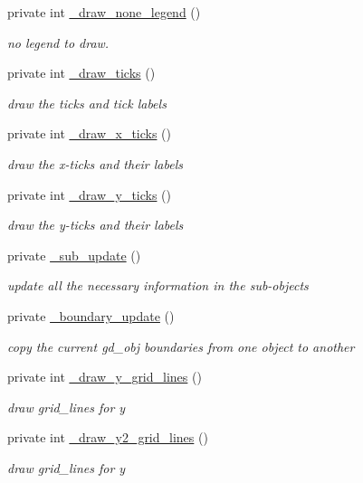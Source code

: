 \begin{DoxyCompactItemize}
private int \hyperlink{classChart_1_1Composite_a1f58fe4c7a6db069a7f4e173ac76a961}{\_\-draw\_\-none\_\-legend} ()
\begin{DoxyCompactList}\small\item\em no legend to draw. \item\end{DoxyCompactList}\item 
private int \hyperlink{classChart_1_1Composite_a7851868c22518f010a467689cec79b93}{\_\-draw\_\-ticks} ()
\begin{DoxyCompactList}\small\item\em draw the ticks and tick labels \item\end{DoxyCompactList}\item 
private int \hyperlink{classChart_1_1Composite_a346409df6cbd56dae5206294a8e9edcb}{\_\-draw\_\-x\_\-ticks} ()
\begin{DoxyCompactList}\small\item\em draw the x-\/ticks and their labels \item\end{DoxyCompactList}\item 
private int \hyperlink{classChart_1_1Composite_a62fd62f54c05506571d4603e5618af30}{\_\-draw\_\-y\_\-ticks} ()
\begin{DoxyCompactList}\small\item\em draw the y-\/ticks and their labels \item\end{DoxyCompactList}\item 
private \hyperlink{classChart_1_1Composite_ac06ff37b9ca2891fa2a11ce3368a7f6e}{\_\-sub\_\-update} ()
\begin{DoxyCompactList}\small\item\em update all the necessary information in the sub-\/objects \item\end{DoxyCompactList}\item 
private \hyperlink{classChart_1_1Composite_a0db68b32279d7b19c3a0336a24bc360c}{\_\-boundary\_\-update} ()
\begin{DoxyCompactList}\small\item\em copy the current gd\_\-obj boundaries from one object to another \item\end{DoxyCompactList}\item 
private int \hyperlink{classChart_1_1Composite_a6a727845be209cb4d9cb825ab6c5ffb1}{\_\-draw\_\-y\_\-grid\_\-lines} ()
\begin{DoxyCompactList}\small\item\em draw grid\_\-lines for y \item\end{DoxyCompactList}\item 
private int \hyperlink{classChart_1_1Composite_a37406d5ce28e2e8a0465eeff8bfd6911}{\_\-draw\_\-y2\_\-grid\_\-lines} ()
\begin{DoxyCompactList}\small\item\em draw grid\_\-lines for y \item\end{DoxyCompactList}\end{DoxyCompactItemize}
